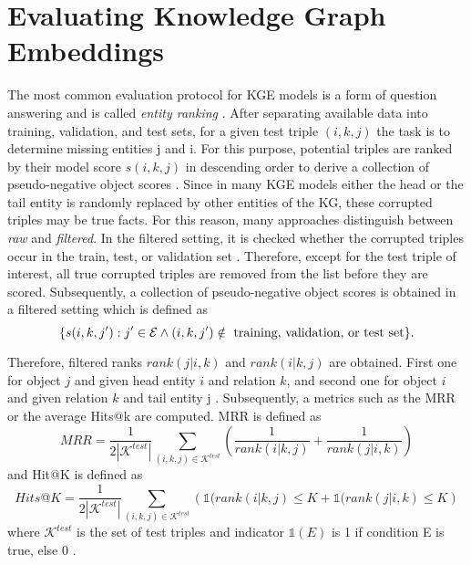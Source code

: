 \section{Evaluating Knowledge Graph Embeddings} 
\label{sec:evaluating_knowledge_graph_embeddings}
%
The most common evaluation protocol for \ac{KGE} models is a form of question answering and is called \textit{entity ranking} \cite{Ruffinelli2020You}.
After separating available data into training, validation, and test sets, for a given test triple $(i,k,j)$ the task is to determine missing entities j and i.
For this purpose, potential triples are ranked by their model score $s(i, k, j)$ in descending order to derive a collection of pseudo-negative object scores \cite{Ruffinelli2020You}.
Since in many \ac{KGE} models either the head or the tail entity is randomly replaced by other entities of the \ac{KG}, these corrupted triples may be true facts.
For this reason, many approaches distinguish between \textit{raw} and \textit{filtered}.
In the filtered setting, it is checked whether the corrupted triples occur in the train, test, or validation set \cite{TransE}.
Therefore, except for the test triple of interest, all true corrupted triples are removed from the list before they are scored.
Subsequently, a collection of pseudo-negative object scores is obtained in a filtered setting  which is defined as \cite{Ruffinelli2020You}
$$\{ s(i, k, j') : j' \in \mathcal{E} \wedge (i, k, j') \notin \text{ training, validation, or test set}\}.$$

Therefore, filtered ranks $rank(j|i, k)$ and $rank(i|k, j)$ are obtained.
First one for object $j$ and given head entity $i$ and relation $k$, 
and second one for object $i$ and given relation $k$ and tail entity j \cite{Ruffinelli2020You}.
Subsequently, a metrics such as the \ac{MRR} or the average Hits@k are computed.
MRR is defined as \cite{Ruffinelli2020You}
\begin{equation}
    MRR = \frac{1}{2 |\mathcal{K}^{test}|} \sum_{(i,k,j) \in  \mathcal{K}^{test}} \left( \frac{1}{rank(i |k,j)} + \frac{1}{rank(j|i,k)} \right)
\end{equation}
and Hit@K is defined as \cite{Ruffinelli2020You}
\begin{equation}
    Hits@K = \frac{1}{2|\mathcal{K}^{test}|} \sum_{(i,k,j) \in  \mathcal{K}^{test}} \left( \mathds{1} (rank(i |k,j) \leq K + \mathds{1}  (rank(j|i,k) \leq K \right)
\end{equation}
where $\mathcal{K}^{test}$ is the set of test triples and indicator $\mathds{1}(E)$ is 1 if condition E is true, else 0 \cite{Ruffinelli2020You}.